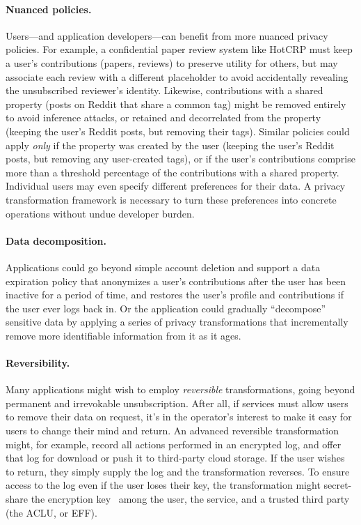 \paragraph{Nuanced policies.}
%
Users---and application developers---can benefit from more nuanced privacy policies.
%
For example, a confidential paper review system like HotCRP must keep a user's contributions
(papers, reviews) to preserve utility for others, but may associate each review with a different
placeholder to avoid accidentally revealing the unsubscribed reviewer's identity.
%
Likewise, contributions with a shared property (\eg posts on Reddit that share a common tag)
might be removed entirely to avoid inference attacks, or retained and decorrelated from the
property (\eg keeping the user's Reddit posts, but removing their tags).
%
Similar policies could apply \emph{only} if the property was created by the user (\eg keeping
the user's Reddit posts, but removing any user-created tags), or if the user's contributions
comprise more than a threshold percentage of the contributions with a shared property.
%
Individual users may even specify different preferences for their data.
%
A privacy transformation framework is necessary to turn these preferences into concrete
operations without undue developer burden.
%

\paragraph{Data decomposition.}
%
Applications could go beyond simple account deletion and support a data expiration policy that
anonymizes a user's contributions after the user has been inactive for a period of time, and
restores the user's profile and contributions if the user ever logs back in.
%
Or the application could gradually ``decompose'' sensitive data by applying a series of
privacy transformations that incrementally remove more identifiable information from it as it
ages.
%

\paragraph{Reversibility.}
%
Many applications might wish to employ \emph{reversible} transformations, going beyond permanent
and irrevokable unsubscription.
%
After all, if services must allow users to remove their data on request, it's in the operator's
interest to make it easy for users to change their mind and return.
%
An advanced reversible transformation might, for example, record all actions performed in an
encrypted log, and offer that log for download or push it to third-party cloud storage.
%
If the user wishes to return, they simply supply the log and the transformation reverses.
%
To ensure access to the log even if the user loses their key, the transformation might
secret-share the encryption key~\cite{secretsharing} among the user, the service, and a trusted
third party (\eg the ACLU, or EFF).
%



